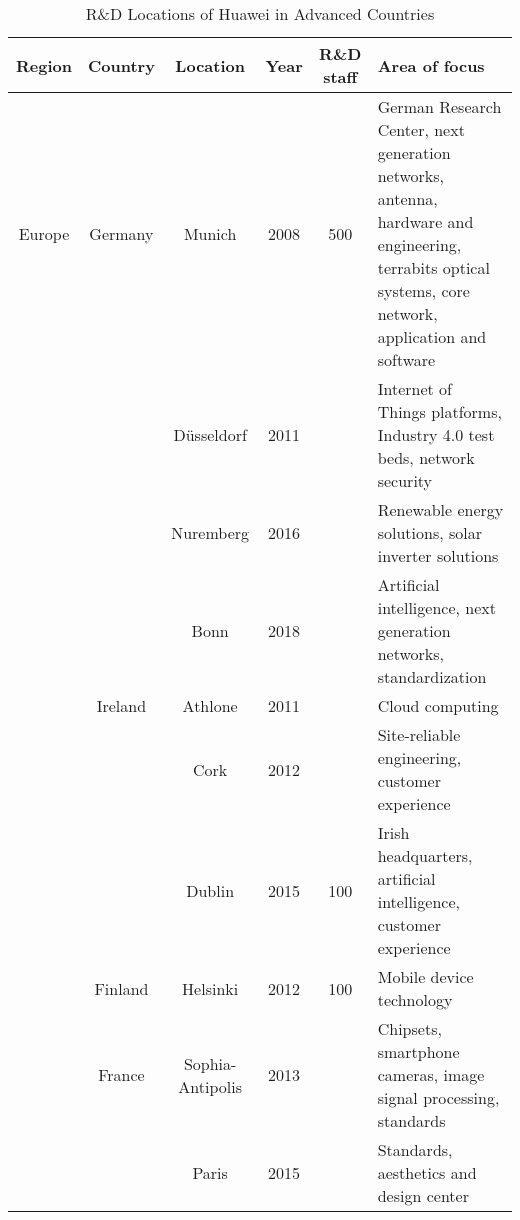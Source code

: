 
\begin{sidewaystable}
	\caption{R\&D Locations of Huawei in Advanced Countries}
	\begin{tabularx}{1.0\textwidth}{cccccX}   %
	\hline
		Region 	& Country 	& Location 	& Year			& R\&D staff	& Area of focus \\
		\hline

		Europe & Germany	& Munich	& 2008\footnotemark[12]			& 500\footnotemark[4]			& German Research Center, next generation networks, antenna, hardware and engineering, terrabits optical systems, core network, application and software\footnotemark[12] \\
				& 			& Düsseldorf & 2011			& 				& Internet of Things platforms, Industry 4.0 test beds, network security\footnotemark[12] \\			
				&			& Nuremberg	& 2016			& 				& Renewable energy solutions, solar inverter solutions\footnotemark[12] \\			
				&			& Bonn		& 2018\footnotemark[8]			& 				& Artificial intelligence, next generation networks, standardization\footnotemark[8] \\
		\cline{2-6}
				& Ireland	& Athlone	& 2011\footnotemark[7]			&				& Cloud computing\footnotemark[7] \\
				&			& Cork		& 2012\footnotemark[7]			& 				& Site-reliable engineering, customer experience\footnotemark[7] \footnotemark[12] \\
				& 			& Dublin	& 2015\footnotemark[7]			& 100\footnotemark[9]			& Irish headquarters, artificial intelligence, customer experience\footnotemark[7] \footnotemark[12] \\
		\cline{2-6}
				& Finland	& Helsinki	& 2012			& 100\footnotemark[6]			& Mobile device technology\footnotemark[12] \\
		\cline{2-6}
				& France	& Sophia-Antipolis	& 2013	& 				& Chipsets, smartphone cameras, image signal processing, standards\footnotemark[12] \\
				&			& Paris		& 2015\footnotemark[1]			& 				& Standards, aesthetics and design center\footnotemark[12]\\
		\cline{1-6}


\end{tabularx}
\end{sidewaystable}
